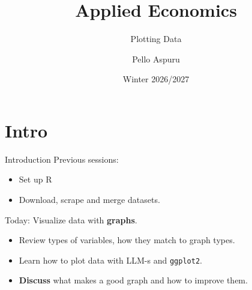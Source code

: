 \documentclass[9pt,aspectratio=169]{beamer}
\title{Applied Economics}
\subtitle{Plotting Data}
\author{Pello Aspuru}
\date{Winter 2026/2027}
\begin{document}
{
  \begin{frame}
    \titlepage
  \end{frame}
}

\section{Intro}

\begin{frame}{Introduction}
  Previous sessions:
  \begin{itemize}
    \item Set up R
    \item Download, scrape and merge datasets.
  \end{itemize}
  Today: Visualize data with \textbf{graphs}.
  \begin{itemize}
    \item Review types of variables, how they match to graph types.
    \item Learn how to plot data with LLM-s and \texttt{ggplot2}.
    \item \textbf{Discuss} what makes a good graph and how to improve them.
  \end{itemize}
\end{frame}
\end{document}
